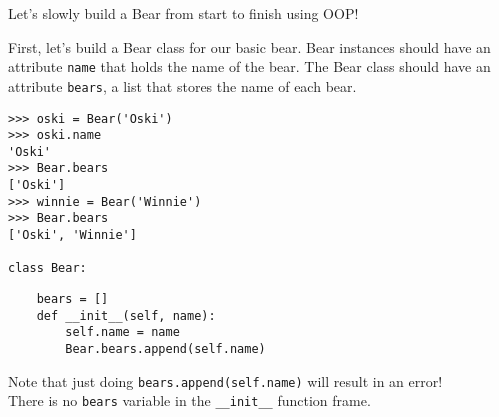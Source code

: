 \begin{blocksection}
\question Let's slowly build a Bear from start to finish using OOP!

First, let's build a Bear class for our basic bear.
Bear instances should have an attribute \lstinline{name} that holds the name of the bear.
The Bear class should have an attribute \lstinline{bears}, a list that stores the name of each bear.
\vspace{1\baselineskip}
\begin{lstlisting}
>>> oski = Bear('Oski')
>>> oski.name
'Oski'
>>> Bear.bears
['Oski']
>>> winnie = Bear('Winnie')
>>> Bear.bears
['Oski', 'Winnie']

class Bear:
\end{lstlisting}

\begin{nonsol}
\vspace{4\baselineskip}
\end{nonsol}

\begin{solution}
  \vspace{-0.5\baselineskip}
\begin{lstlisting}
    bears = []
    def __init__(self, name):
        self.name = name
        Bear.bears.append(self.name)
\end{lstlisting}

Note that just doing \lstinline{bears.append(self.name)} will result in an error!
\\There is no \lstinline{bears} variable in the \lstinline{__init__} function frame.
\end{solution}
\end{blocksection}

\vspace{1\baselineskip}

